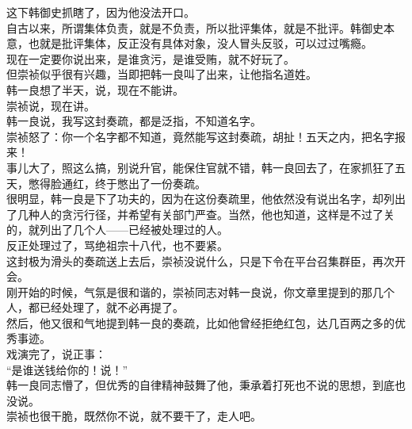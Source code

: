 \begin{multicols}{\theparacolNo}
这下韩御史抓瞎了，因为他没法开口。\\

自古以来，所谓集体负责，就是不负责，所以批评集体，就是不批评。韩御史本意，也就是批评集体，反正没有具体对象，没人冒头反驳，可以过过嘴瘾。\\

现在一定要你说出来，是谁贪污，是谁受贿，就不好玩了。\\

但崇祯似乎很有兴趣，当即把韩一良叫了出来，让他指名道姓。\\

韩一良想了半天，说，现在不能讲。\\

崇祯说，现在讲。\\

韩一良说，我写这封奏疏，都是泛指，不知道名字。\\

崇祯怒了：你一个名字都不知道，竟然能写这封奏疏，胡扯！五天之内，把名字报来！\\

事儿大了，照这么搞，别说升官，能保住官就不错，韩一良回去了，在家抓狂了五天，憋得脸通红，终于憋出了一份奏疏。\\

很明显，韩一良是下了功夫的，因为在这份奏疏里，他依然没有说出名字，却列出了几种人的贪污行径，并希望有关部门严查。当然，他也知道，这样是不过了关的，就列出了几个人——已经被处理过的人。\\

反正处理过了，骂绝祖宗十八代，也不要紧。\\

这封极为滑头的奏疏送上去后，崇祯没说什么，只是下令在平台召集群臣，再次开会。\\

刚开始的时候，气氛是很和谐的，崇祯同志对韩一良说，你文章里提到的那几个人，都已经处理了，就不必再提了。\\

然后，他又很和气地提到韩一良的奏疏，比如他曾经拒绝红包，达几百两之多的优秀事迹。\\

戏演完了，说正事：\\

“是谁送钱给你的！说！”\\

韩一良同志懵了，但优秀的自律精神鼓舞了他，秉承着打死也不说的思想，到底也没说。\\

崇祯也很干脆，既然你不说，就不要干了，走人吧。\\


\end{multicols}

